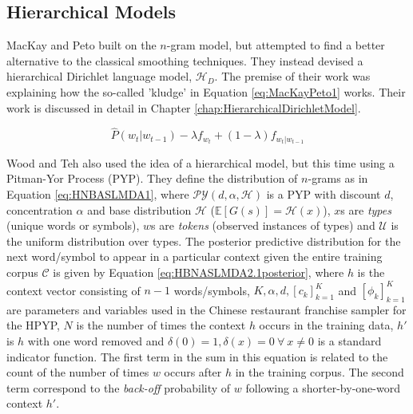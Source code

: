 
\subsection{Hierarchical Models}

MacKay and Peto \cite{mackay1995hierarchical} built on the $n$-gram model, but attempted to find a better alternative to the classical smoothing techniques. They instead devised a hierarchical Dirichlet language model, $\mathscr{H}_{D}$. The premise of their work was explaining how the so-called 'kludge' in Equation \ref{eq:MacKayPeto1} works. Their work is discussed in detail in Chapter \ref{chap:HierarchicalDirichletModel}.


\begin{equation}
\hat{P}(w_{t}|w_{t-1})-\lambda f_{w_{t}}+(1-\lambda)f_{w_{t}|w_{t-1}}
\label{eq:MacKayPeto1}
\end{equation}




Wood and Teh \cite{wood2008hierarchical} \cite{wood2009hierarchical} also used the idea of a hierarchical model, but this time using a Pitman-Yor Process (PYP). They define the distribution of $n$-grams as in Equation \ref{eq:HNBASLMDA1}, where $\mathcal{PY}(d,\alpha,\mathcal{H})$ is a PYP with discount $d$, concentration $\alpha$ and base distribution $\mathcal{H}$ ($\mathbb{E}[G(s)]=\mathcal{H}(x)$), $x$s are \textit{types} (unique words or symbols), $w$s are \textit{tokens} (observed instances of types) and $\mathcal{U}$ is the uniform distribution over types. The posterior predictive distribution for the next word/symbol to appear in a particular context given the entire training corpus $\mathcal{C}$ is given by Equation \ref{eq:HBNASLMDA2.1posterior}, where $h$ is the context vector consisting of $n-1$ words/symbols, $K,\alpha,d,[c_{k}]_{k=1}^{K}$ and $[\phi_{k}]_{k=1}^{K}$ are parameters and variables used in the Chinese restaurant franchise sampler for the HPYP, $N$ is the number of times the context $h$ occurs in the training data, $h'$ is $h$ with one word removed and $\delta(0)=1,\delta(x)=0\ \forall\ x\neq0$ is a standard indicator function. The first term in the sum in this equation is related to the count of the number of times $w$ occurs after $h$ in the training corpus. The second term correspond to the \textit{back-off} probability of $w$ following a shorter-by-one-word context $h'$.

